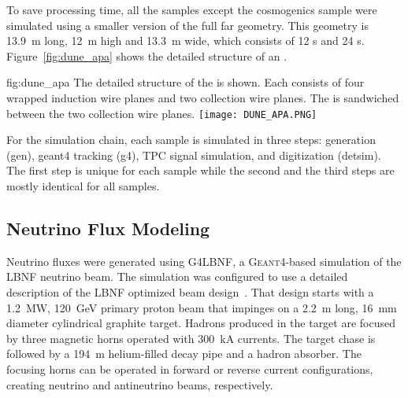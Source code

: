 To save processing time, all the  samples except the cosmogenics sample were simulated using a smaller version of the full \nominalmodsize far  geometry. This geometry is \SI{13.9}{m} long, \SI{12}{m} high and \SI{13.3}{m} wide, which consists of 12 s and 24 s. %
Figure~\ref{fig:dune_apa} shows the detailed structure of an . %
\begin{dunefigure}
{fig:dune_apa}
{The detailed structure of the  is shown. Each  consists of four wrapped induction wire planes and two collection wire planes.
The  is sandwiched between the two collection wire planes.}
\texttt{[image: DUNE\_APA.PNG]}
\end{dunefigure}


For the simulation chain, each sample is simulated in three steps: generation (gen), {\sc geant4} tracking (g4), TPC signal simulation, and digitization (detsim). The first step is unique for each sample while the second and the third steps are mostly identical for all samples. 

\subsection{Neutrino Flux Modeling}
\label{sec:tools-mc-flux}

Neutrino fluxes were generated using G4LBNF, a \textsc{Geant}4\xspace-based simulation of the LBNF neutrino beam.  The simulation was configured to use a detailed description of the LBNF optimized beam design~\cite{optimizedbeamcdr}.  That design starts with a \SI{1.2}{MW}, \SI{120}{\GeV} primary proton beam that impinges on a \SI{2.2}{m} long, \SI{16}{mm} diameter cylindrical graphite target.  Hadrons produced in the target are focused by three magnetic horns operated with \SI{300}{kA} currents.  The target chase is followed by a \SI{194}{m} helium-filled decay pipe and a hadron absorber.  The focusing horns can be operated in forward or reverse current configurations, creating neutrino and antineutrino beams, respectively.   

